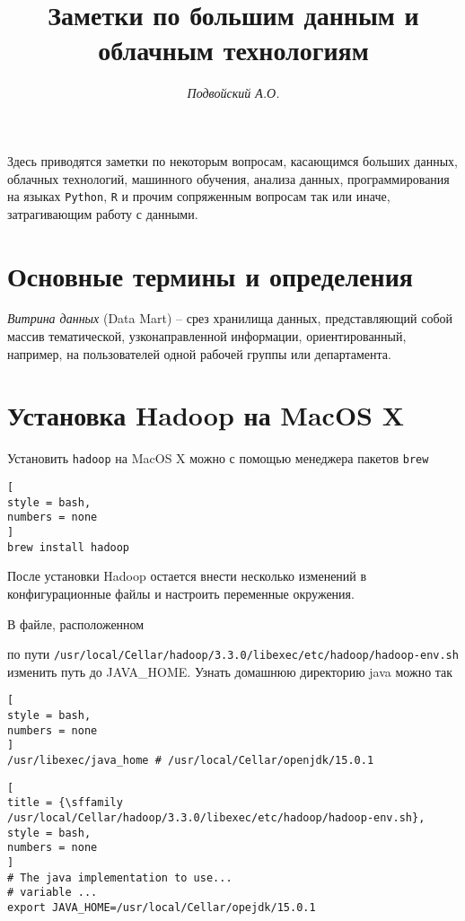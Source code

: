 \documentclass[%
	11pt,
	a4paper,
	utf8,
		]{article}
\begin{document}
\title{Заметки по большим данным и облачным технологиям}

\author{\itshape Подвойский А.О.}

\date{}
\maketitle

\thispagestyle{fancy}

Здесь приводятся заметки по некоторым вопросам, касающимся больших данных, облачных технологий, машинного обучения, анализа данных, программирования на языках \texttt{Python}, \texttt{R} и прочим сопряженным вопросам так или иначе, затрагивающим работу с данными.



\tableofcontents

\section{Основные термины и определения}

\noindent\emph{Витрина данных} (Data Mart) -- срез хранилища данных, представляющий собой массив тематической, узконаправленной информации, ориентированный, например, на пользователей одной рабочей группы или департамента.


\section{Установка Hadoop на MacOS X}

Установить \texttt{hadoop} на MacOS X можно с помощью менеджера пакетов \texttt{brew}
\begin{lstlisting}[
style = bash,
numbers = none	
]
brew install hadoop
\end{lstlisting}

После установки Hadoop остается внести несколько изменений в конфигурационные файлы и настроить переменные окружения.

В файле, расположенном

по пути \texttt{/usr/local/Cellar/hadoop/3.3.0/libexec/etc/hadoop/hadoop-env.sh} изменить путь до JAVA\_HOME. Узнать домашнюю директорию java можно так
\begin{lstlisting}[
style = bash,
numbers = none	
]
/usr/libexec/java_home # /usr/local/Cellar/openjdk/15.0.1
\end{lstlisting}

\begin{lstlisting}[
title = {\sffamily /usr/local/Cellar/hadoop/3.3.0/libexec/etc/hadoop/hadoop-env.sh},
style = bash,
numbers = none	
]
# The java implementation to use...
# variable ...
export JAVA_HOME=/usr/local/Cellar/opejdk/15.0.1
\end{lstlisting}
\end{document}
